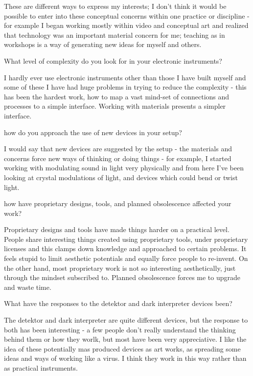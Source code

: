 These are different ways to express my interests; I don't think it
would be possible to enter into these conceptual concerns within one
practice or discipline - for example I began working mostly within
video and conceptual art and realized that technology was an
important material concern for me; teaching as in workshops is a way
of generating new ideas for myself and others.


What level of complexity do you look for in your electronic instruments? 

I hardly ever use electronic instruments other than those I have
built myself and some of these I have had huge problems in trying to
reduce the complexity - this has been the hardest work, how to map a
vast mind-set of connections and processes to a simple
interface. Working with materials presents a simpler interface.


how do you approach the use of new devices in your setup? 

I would say that new devices are suggested by the setup - the
materials and concerns force new ways of thinking or doing things -
for example, I started working with modulating sound in light very
physically and from here I've been looking at crystal modulations of
light, and devices which could bend or twist light.


how have proprietary designs, tools, and planned obsolescence affected your work? 

Proprietary designs and tools have made things harder on a practical
level. People share interesting things created using proprietary
tools, under proprietary licenses and this clamps down knowledge and
approached to certain problems. It feels stupid to limit aesthetic
potentials and equally force people to re-invent. On the other hand,
most proprietary work is not so interesting aesthetically, just
through the mindset subscribed to. Planned obsolescence forces me to
upgrade and waste time.


What have the responses to the detektor and dark interpreter devices been? 

The detektor and dark interpreter are quite different devices, but
the response to both has been interesting - a few people don't really
understand the thinking behind them or how they worlk, but most have
been very appreciative. I like the idea of these potentially mas
produced devices as art works, as spreading some ideas and ways of
working like a virus. I think they work in this way rather than as
practical instruments.


